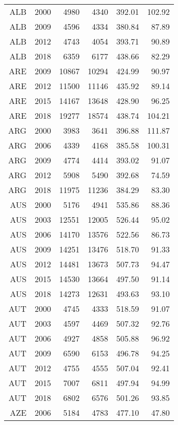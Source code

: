 \begin{longtable}{|r|r|r|r|r|r|}
\hline \hline
\endlastfoot
    ALB   & 2000  & 4980  & 4340  & 392.01 & 102.92 \\
    ALB   & 2009  & 4596  & 4334  & 380.84 & 87.89 \\
    ALB   & 2012  & 4743  & 4054  & 393.71 & 90.89 \\
    ALB   & 2018  & 6359  & 6177  & 438.66 & 82.29 \\
    ARE   & 2009  & 10867 & 10294 & 424.99 & 90.97 \\
    ARE   & 2012  & 11500 & 11146 & 435.92 & 89.14 \\
    ARE   & 2015  & 14167 & 13648 & 428.90 & 96.25 \\
    ARE   & 2018  & 19277 & 18574 & 438.74 & 104.21 \\
    ARG   & 2000  & 3983  & 3641  & 396.88 & 111.87 \\
    ARG   & 2006  & 4339  & 4168  & 385.58 & 100.31 \\
    ARG   & 2009  & 4774  & 4414  & 393.02 & 91.07 \\
    ARG   & 2012  & 5908  & 5490  & 392.68 & 74.59 \\
    ARG   & 2018  & 11975 & 11236 & 384.29 & 83.30 \\
    AUS   & 2000  & 5176  & 4941  & 535.86 & 88.36 \\
    AUS   & 2003  & 12551 & 12005 & 526.44 & 95.02 \\
    AUS   & 2006  & 14170 & 13576 & 522.56 & 86.73 \\
    AUS   & 2009  & 14251 & 13476 & 518.70 & 91.33 \\
    AUS   & 2012  & 14481 & 13673 & 507.73 & 94.47 \\
    AUS   & 2015  & 14530 & 13664 & 497.50 & 91.14 \\
    AUS   & 2018  & 14273 & 12631 & 493.63 & 93.10 \\
    AUT   & 2000  & 4745  & 4333  & 518.59 & 91.07 \\
    AUT   & 2003  & 4597  & 4469  & 507.32 & 92.76 \\
    AUT   & 2006  & 4927  & 4858  & 505.88 & 96.92 \\
    AUT   & 2009  & 6590  & 6153  & 496.78 & 94.25 \\
    AUT   & 2012  & 4755  & 4555  & 507.04 & 92.41 \\
    AUT   & 2015  & 7007  & 6811  & 497.94 & 94.99 \\
    AUT   & 2018  & 6802  & 6576  & 501.26 & 93.85 \\
    AZE   & 2006  & 5184  & 4783  & 477.10 & 47.80 \\

\end{longtable}
